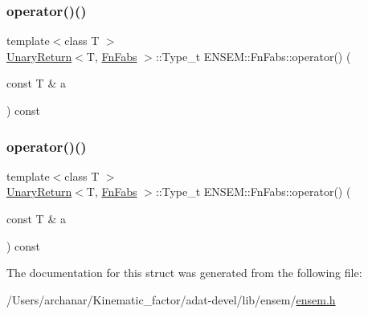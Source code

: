 \mbox{\label{structENSEM_1_1FnFabs_a655393f2e089d6fb5f266991b83ffb12}} 
\subsubsection{\texorpdfstring{operator()()}{operator()()}\hspace{0.1cm}{\footnotesize\ttfamily [2/3]}}
{\footnotesize\ttfamily template$<$class T $>$ \\
\mbox{\hyperlink{structENSEM_1_1UnaryReturn}{Unary\+Return}}$<$T, \mbox{\hyperlink{structENSEM_1_1FnFabs}{Fn\+Fabs}} $>$\+::Type\+\_\+t E\+N\+S\+E\+M\+::\+Fn\+Fabs\+::operator() (\begin{DoxyParamCaption}\item[{const T \&}]{a }\end{DoxyParamCaption}) const\hspace{0.3cm}{\ttfamily [inline]}}

\mbox{\label{structENSEM_1_1FnFabs_a655393f2e089d6fb5f266991b83ffb12}} 
\subsubsection{\texorpdfstring{operator()()}{operator()()}\hspace{0.1cm}{\footnotesize\ttfamily [3/3]}}
{\footnotesize\ttfamily template$<$class T $>$ \\
\mbox{\hyperlink{structENSEM_1_1UnaryReturn}{Unary\+Return}}$<$T, \mbox{\hyperlink{structENSEM_1_1FnFabs}{Fn\+Fabs}} $>$\+::Type\+\_\+t E\+N\+S\+E\+M\+::\+Fn\+Fabs\+::operator() (\begin{DoxyParamCaption}\item[{const T \&}]{a }\end{DoxyParamCaption}) const\hspace{0.3cm}{\ttfamily [inline]}}



The documentation for this struct was generated from the following file\+:\begin{DoxyCompactItemize}
\item 
/\+Users/archanar/\+Kinematic\+\_\+factor/adat-\/devel/lib/ensem/\mbox{\hyperlink{adat-devel_2lib_2ensem_2ensem_8h}{ensem.\+h}}\end{DoxyCompactItemize}
